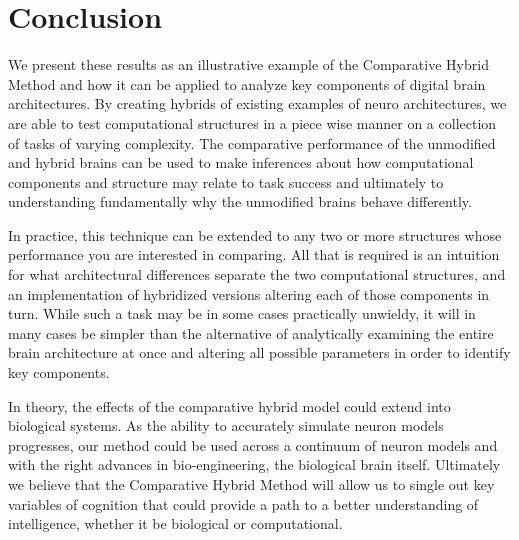 \section{Conclusion}

We present these results as an illustrative example of the Comparative Hybrid Method and how it can be applied to analyze key components of digital brain architectures. 
By creating hybrids of existing examples of neuro architectures, we are able to test computational structures in a piece wise manner on a collection of tasks of varying complexity. 
The comparative performance of the unmodified and hybrid brains can be used to make inferences about how computational components and structure may relate to task success and ultimately to understanding fundamentally why the unmodified brains behave differently.

In practice, this technique can be extended to any two or more structures whose performance you are interested in comparing.
All that is required is an intuition for what architectural differences separate the two computational structures, and an implementation of hybridized versions altering each of those components in turn. 
While such a task may be in some cases practically unwieldy, it will in many cases be simpler than the alternative of analytically examining the entire brain architecture at once and altering all possible parameters in order to identify key components.

In theory, the effects of the comparative hybrid model could extend into biological systems. 
As the ability to accurately simulate neuron models progresses, our method could be used across a continuum of neuron models and with the right advances in bio-engineering, the biological brain itself. 
Ultimately we believe that the Comparative Hybrid Method will allow us to single out key variables of cognition that could provide a path to a better understanding of intelligence, whether it be biological or computational. 